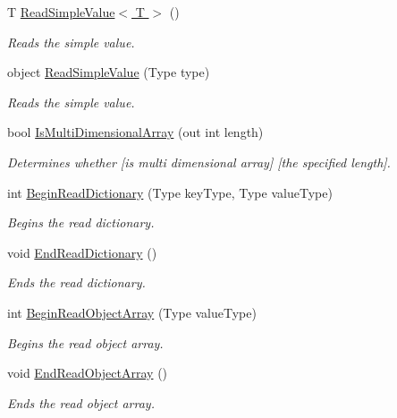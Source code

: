 \begin{DoxyCompactItemize}
T \hyperlink{class_serialization_1_1_binary_serializer_ad46b4de7951611009e2e85d00ad8178d}{Read\+Simple\+Value$<$ T $>$} ()
\begin{DoxyCompactList}\small\item\em Reads the simple value. \end{DoxyCompactList}\item 
object \hyperlink{class_serialization_1_1_binary_serializer_a7b85fa9bbbd8e2b9167abb58e45b2a82}{Read\+Simple\+Value} (Type type)
\begin{DoxyCompactList}\small\item\em Reads the simple value. \end{DoxyCompactList}\item 
bool \hyperlink{class_serialization_1_1_binary_serializer_a87e06dfca74d1ebc475999bd0c2f9596}{Is\+Multi\+Dimensional\+Array} (out int length)
\begin{DoxyCompactList}\small\item\em Determines whether \mbox{[}is multi dimensional array\mbox{]} \mbox{[}the specified length\mbox{]}. \end{DoxyCompactList}\item 
int \hyperlink{class_serialization_1_1_binary_serializer_adbc9aab40ec3aa70f3cd72ddbd6bbcba}{Begin\+Read\+Dictionary} (Type key\+Type, Type value\+Type)
\begin{DoxyCompactList}\small\item\em Begins the read dictionary. \end{DoxyCompactList}\item 
void \hyperlink{class_serialization_1_1_binary_serializer_aeacb7cb7b4c86a1ad310ac1b0674c18c}{End\+Read\+Dictionary} ()
\begin{DoxyCompactList}\small\item\em Ends the read dictionary. \end{DoxyCompactList}\item 
int \hyperlink{class_serialization_1_1_binary_serializer_a0d547b6b511f0e0e547f3e2b231d2b68}{Begin\+Read\+Object\+Array} (Type value\+Type)
\begin{DoxyCompactList}\small\item\em Begins the read object array. \end{DoxyCompactList}\item 
void \hyperlink{class_serialization_1_1_binary_serializer_a3e796b301e9539b9082e0b32e3f61d49}{End\+Read\+Object\+Array} ()
\begin{DoxyCompactList}\small\item\em Ends the read object array. \end{DoxyCompactList}\item 

\end{DoxyCompactItemize}
